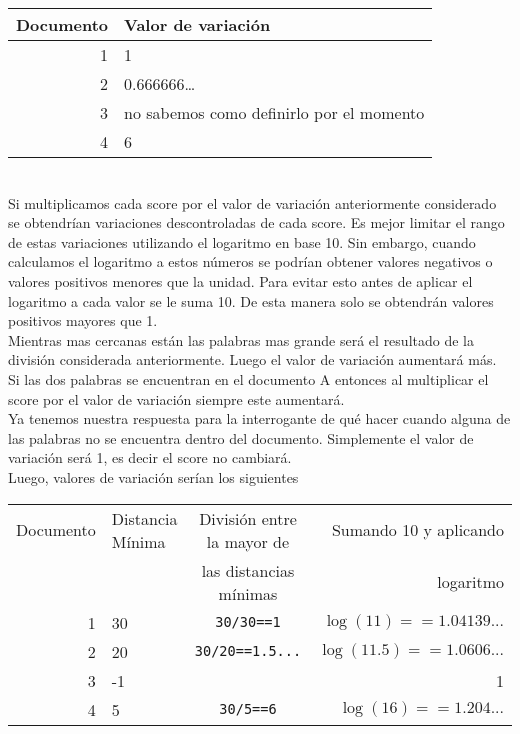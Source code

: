 \documentclass[12pt]{article}
\begin{document}
\begin{tabular}{|r|l|}
\hline
Documento   &    Valor de variaci\'on  \\
\hline
1           &      1     \\
2           &     0.666666…    \\
3           &     no sabemos como definirlo por el momento    \\
4           &     6     \\
\hline
\end{tabular} \\



Si multiplicamos cada score por el valor de variaci\'on anteriormente considerado se obtendr\'ian variaciones descontroladas de cada score. Es mejor limitar el rango de estas variaciones utilizando el logaritmo en base 10.
Sin embargo, cuando calculamos el logaritmo a estos n\'umeros se podr\'ian obtener valores negativos o valores positivos menores que la unidad. Para evitar esto antes de aplicar el logaritmo a cada valor se le suma 10. De esta manera solo se obtendr\'an valores positivos mayores que 1.\\
Mientras mas cercanas est\'an las palabras mas grande ser\'a el resultado de la divisi\'on considerada anteriormente. Luego el valor de variaci\'on aumentar\'a m\'as. Si las dos palabras se encuentran en el documento A entonces al multiplicar el score por el valor de variaci\'on siempre este aumentar\'a.\\
Ya tenemos nuestra respuesta para la interrogante de qu\'e hacer cuando alguna de las palabras no se encuentra dentro del documento. Simplemente el valor de variaci\'on ser\'a 1, es decir el score no cambiar\'a. \\

  Luego, valores de variaci\'on ser\'ian los siguientes
  
  \begin{tabular}{|r|l|c|r|}
  \hline
  Documento  &  Distancia M\'inima   &   Divisi\'on entre la mayor de  &    Sumando 10 y aplicando  \\
             &                       &   las distancias m\'inimas      &    logaritmo               \\
  \hline
  1  &  30  &  \verb|30/30==1|  &  $\log(11) == 1.04139...$ \\
  2  &  20  &  \verb|30/20==1.5...|  &  $\log(11.5)== 1.0606...$ \\
  3  &  -1  &     &   1  \\
  4  &  5   &  \verb|30/5==6|  &  $\log(16)== 1.204...$  \\
  \hline
  \end{tabular}
\end{document}
